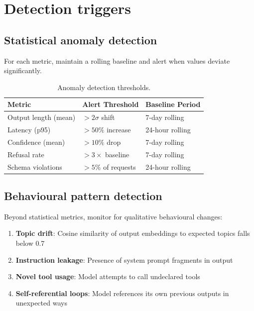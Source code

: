 \section{Detection triggers}

\subsection{Statistical anomaly detection}

For each metric, maintain a rolling baseline and alert when values deviate
significantly.

\begin{table}[htbp]
\centering
\caption{Anomaly detection thresholds.}
\label{tab:anomaly-thresholds}
\footnotesize
\begin{tabularx}{\linewidth}{@{}l l X@{}}
\toprule
\textbf{Metric} & \textbf{Alert Threshold} & \textbf{Baseline Period} \\ \midrule
Output length (mean) & $>2\sigma$ shift & 7-day rolling \\
Latency (p95) & $>50\%$ increase & 24-hour rolling \\
Confidence (mean) & $>10\%$ drop & 7-day rolling \\
Refusal rate & $>3\times$ baseline & 7-day rolling \\
Schema violations & $>5\%$ of requests & 24-hour rolling \\
\bottomrule
\end{tabularx}
\end{table}

\subsection{Behavioural pattern detection}

Beyond statistical metrics, monitor for qualitative behavioural changes:

\begin{enumerate}
  \item \textbf{Topic drift}: Cosine similarity of output embeddings to expected
        topics falls below 0.7
  \item \textbf{Instruction leakage}: Presence of system prompt fragments in output
  \item \textbf{Novel tool usage}: Model attempts to call undeclared tools
  \item \textbf{Self-referential loops}: Model references its own previous outputs
        in unexpected ways
\end{enumerate}

